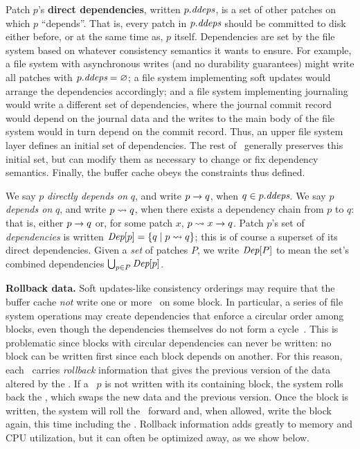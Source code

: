 Patch $p$'s \textbf{direct dependencies}, written $\PDDepset{p}$, is a set of
 other patches on which $p$ ``depends''.
%
That is, every patch in $\PDDepset{p}$ should be committed to disk either
 before, or at the same time as, $p$ itself.
%
Dependencies are set by the file system based on whatever consistency
 semantics it wants to ensure.
%
For example, a file system with asynchronous writes (and no durability
 guarantees) might write all patches with $\PDDepset{p} = \emptyset$;
%
a file system implementing soft updates would arrange the dependencies
 accordingly;
%
and a file system implementing journaling would write a different set of
 dependencies, where the journal commit record would depend on the journal
 data and the writes to the main body of the file system would in turn
 depend on the commit record.
%
Thus, an upper file system layer defines an initial set of
 dependencies.
%
The rest of \Kudos\ generally preserves this initial set, but can modify
 them as necessary to change or fix dependency semantics.
%
Finally, the buffer cache obeys the constraints thus defined.


We say $p$ \emph{directly depends on} $q$, and write $p \rightarrow q$, when
 $q \in \PDDepset{p}$.
%
We say $p$ \emph{depends on} $q$, and write $p \leadsto q$, when there
 exists a dependency chain from $p$ to $q$: that is, either $p \rightarrow q$
 or, for some patch $x$, $p \leadsto x \rightarrow q$.
%
Patch $p$'s set of \emph{dependencies} is written $\textit{Dep}[p] = \{ q \mid
 p \leadsto q \}$; this is of course a superset of its direct dependencies.
%
Given a \emph{set} of patches $P$, we write $\textit{Dep}[P]$ to mean the set's
 combined dependencies $\bigcup_{p\in P} \textit{Dep}[p]$.



\textbf{Rollback data.}
%
Soft updates-like consistency orderings may require that the buffer cache
\emph{not} write one or more \patches\ on some block.
%
In particular, a series of file system operations may create dependencies
that enforce a circular order among blocks, even though the dependencies
themselves do not form a cycle~\cite{ganger00soft}.
%
This is problematic since blocks with circular dependencies can never be
written: no block can be written first since each block depends on another.
%
For this reason, each \patch\ carries \emph{rollback} information that gives
the previous version of the data altered by the \patch.
%
If a \patch\ $p$ is not written with its containing block, the system rolls
back the \patch, which swaps the new data and the previous version.
%
Once the block is written, the system will roll the \patch\ forward and, when
allowed, write the block again, this time including the \patch.
%
Rollback information adds greatly to memory and CPU utilization, but it can
often be optimized away, as we show below.


